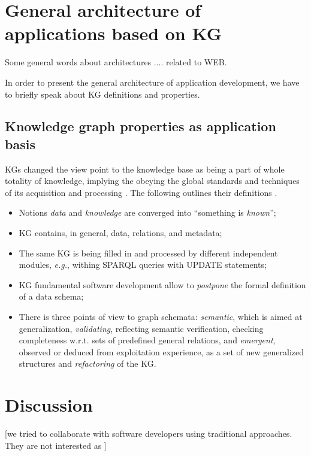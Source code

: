 \documentclass[
]{ceurart}
\begin{document}
\section{General architecture of applications based on KG}
\label{sec:architecture}

Some general words about architectures .... related to WEB.

In order to present the general architecture of application development, we have to briefly speak about KG definitions and properties.

\subsection{Knowledge graph properties as application basis}
\label{sec:kg-as-basis}

KGs changed the view point to the knowledge base as being a part of whole totality of knowledge, implying the obeying the global standards and techniques of its acquisition and processing \cite{hogan}.  The following outlines their definitions \cite{hogan}.
 \begin{itemize}
  \item Notions \emph{data} and \emph{knowledge} are converged into ``something is \emph{known}'';
  \item KG contains, in general, data, relations, and metadata;
  \item The same KG is being filled in and processed by different independent modules, \emph{e.g.}, withing SPARQL queries with UPDATE statements;
  \item KG fundamental software development allow to \emph{postpone} the formal definition of a data schema;
  \item There is three points of view to graph schemata: \emph{semantic}, which is aimed at generalization, \emph{validating}, reflecting semantic verification, checking completeness w.r.t. sets of predefined general relations, and \emph{emergent}, observed or deduced from exploitation experience, as a set of new generalized structures and \emph{refactoring} of the KG.
  \end{itemize}



\section{Discussion}
\label{sec:disc}


[we tried to collaborate with software developers using traditional approaches.  They are not interested as ]
\end{document}
